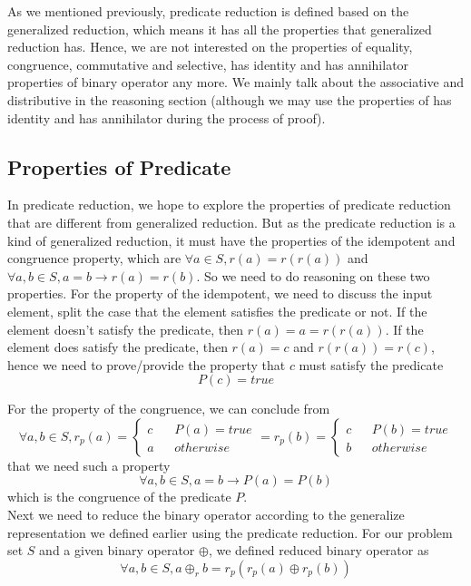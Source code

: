 \documentclass[a4paper,10pt]{article}
\newcommand{\e}[2]{
\begin{equation}
  \label{#1} 
  #2
\end{equation}
}
\begin{document}
As we mentioned previously, predicate reduction is defined based on the generalized reduction, which means it has all the properties that generalized reduction has. Hence, we are not interested on the properties of equality, congruence, commutative and selective, has identity and has annihilator properties of binary operator any more. We mainly talk about the associative and distributive in the reasoning section (although we may use the properties of has identity and has annihilator during the process of proof).

\subsection{Properties of Predicate}
In predicate reduction, we hope to explore the properties of predicate reduction that are different from generalized reduction.
But as the predicate reduction is a kind of generalized reduction, it must have the properties of the idempotent and congruence property, which are $\forall a \in S, r(a) = r(r(a))$ and $\forall a,b\in S, a = b \rightarrow r(a) = r(b)$. So we need to do reasoning on these two properties. For the property of the idempotent, we need to discuss the input element, split the case that the element satisfies the predicate or not. If the element doesn't satisfy the predicate, then $r(a) = a = r(r(a))$. If the element does satisfy the predicate, then $r(a) = c$ and $r(r(a)) = r(c)$, hence we need to prove/provide the property that $c$ must satisfy the predicate \e{pr:proof:p_true}{P(c) = true}
For the property of the congruence, we can conclude from 
\[\forall a,b \in S, r_p(a)=\left\{
\begin{aligned}
c &  & P(a) = true \\
a &  & otherwise 
\end{aligned}
\right. = 
r_p(b)=\left\{
\begin{aligned}
c &  & P(b) = true \\
b &  & otherwise 
\end{aligned}
\right.\] that we need such a property \e{pr:proof:p_cong}{\forall a,b \in S, a = b \rightarrow P(a) = P(b)} which is the congruence of the predicate $P$.\\

Next we need to reduce the binary operator according to the generalize representation we defined earlier using the predicate reduction. For our problem set $S$ and a given binary operator $\oplus$, we defined reduced binary operator as \e{pr:def:binary_operator}{\forall a,b \in S, a \oplus_r b = r_p (r_p(a) \oplus r_p(b))}
\end{document}
